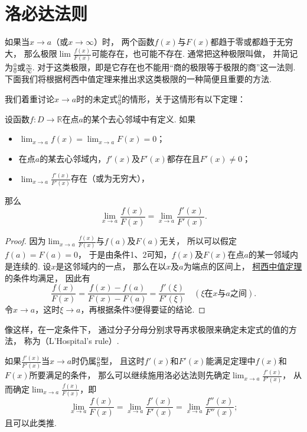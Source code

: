 \section{洛必达法则}
如果当\(x \to a\)（或\(x \to \infty\)）时，
两个函数\(f(x)\)与\(F(x)\)都趋于零或都趋于无穷大，
那么极限\(\lim\frac{f(x)}{F(x)}\)可能存在，也可能不存在.
通常把这种极限叫做，
并简记为\(\frac{0}{0}\)或\(\frac{\infty}{\infty}\).
对于这类极限，即是它存在也不能用“商的极限等于极限的商”这一法则.
下面我们将根据柯西中值定理来推出求这类极限的一种简便且重要的方法.

我们着重讨论\(x \to a\)时的未定式\(\frac{0}{0}\)的情形，关于这情形有以下定理：
\begin{theorem}\label{theorem:微分中值定理.洛必达法则1}
设函数\(f\colon D\to\mathbb{R}\)在点\(a\)的某个去心邻域中有定义.
如果\begin{itemize}
	\item \(\lim_{x\to a} f(x) = \lim_{x\to a} F(x) = 0\)；
	\item 在点\(a\)的某去心邻域内，\(f'(x)\)及\(F'(x)\)都存在且\(F'(x) \neq 0\)；
	\item \(\lim_{x \to a} \frac{f'(x)}{F'(x)}\)存在（或为无穷大），
\end{itemize}
那么\[
	\lim_{x \to a} \frac{f(x)}{F(x)}
	= \lim_{x \to a} \frac{f'(x)}{F'(x)}.
\]
\begin{proof}
因为\(\lim_{x\to a} \frac{f(x)}{F(x)}\)与\(f(a)\)及\(F(a)\)无关，
所以可以假定\(f(a)=F(a)=0\)，
于是由条件1、2可知，\(f(x)\)及\(F(x)\)在点\(a\)的某一邻域内是连续的.
设\(x\)是这邻域内的一点，
那么在以\(x\)及\(a\)为端点的区间上，
\hyperref[theorem:微分中值定理.柯西中值定理]{柯西中值定理}的条件均满足，
因此有\[
	\frac{f(x)}{F(x)}
	= \frac{f(x)-f(a)}{F(x)-F(a)}
	= \frac{f'(\xi)}{F'(\xi)}
	\quad(\text{\(\xi\)在\(x\)与\(a\)之间}).
\]
令\(x \to a\)，这时\(\xi \to a\)，再根据条件3便得要证的结论.
\end{proof}
\end{theorem}
像这样，在一定条件下，
通过分子分母分别求导再求极限来确定未定式的值的方法，
称为（L'Hospital's rule）.

如果\(\frac{f'(x)}{F'(x)}\)当\(x \to a\)时仍属\(\frac{0}{0}\)型，
且这时\(f'(x)\)和\(F'(x)\)能满足定理中\(f(x)\)和\(F(x)\)所要满足的条件，
那么可以继续施用洛必达法则先确定\(\lim_{x \to a} \frac{f'(x)}{F'(x)}\)，
从而确定\(\lim_{x \to a} \frac{f(x)}{F(x)}\)，即\[
	\lim_{x \to a} \frac{f(x)}{F(x)}
	= \lim_{x \to a} \frac{f'(x)}{F'(x)}
	= \lim_{x \to a} \frac{f''(x)}{F''(x)};
\]
且可以此类推.


